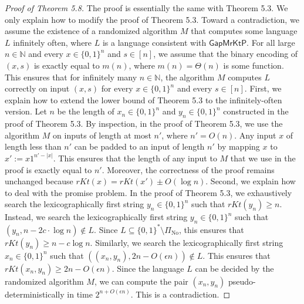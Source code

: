 \begin{proof}[Proof of Theorem 5.8]
The proof is essentially the same with Theorem 5.3. We only explain how to modify the proof of Theorem 5.3.
Toward a contradiction, we assume the existence of a randomized algorithm $M$ that computes some language $L$ infinitely often, where $L$ is a language consistent with $\mathsf{GapMrKtP}$. For all large $n\in\mathbb N$ and every $x\in\{0,1\}^n$ and $s\in[n]$, we assume that the binary encoding of $(x,s)$ is exactly equal to $m(n)$, where $m(n)=\Theta(n)$ is some function. This ensures that for infinitely many $n\in\mathbb N$, the algorithm $M$ computes $L$ correctly on input $(x,s)$ for every $x\in\{0,1\}^n$ and every $s\in[n]$.
First, we explain how to extend the lower bound of Theorem 5.3 to the infinitely-often version. Let $n$ be the length of $x_n\in\{0,1\}^n$ and $y_n\in\{0,1\}^n$ constructed in the proof of Theorem 5.3. By inspection, in the proof of Theorem 5.3, we use the algorithm $M$ on inputs of length at most $n'$, where $n'=O(n)$. Any input $x$ of length less than $n'$ can be padded to an input of length $n'$ by mapping $x$ to $x':=x1^{n'-|x|}$. This ensures that the length of any input to $M$ that we use in the proof is exactly equal to $n'$. Moreover, the correctness of the proof remains unchanged because $rKt(x)=rKt(x')\pm O(\log n)$.
Second, we explain how to deal with the promise problem. In the proof of Theorem 5.3, we exhaustively search the lexicographically first string $y_n\in\{0,1\}^n$ such that $rKt(y_n)\geq n$. Instead, we search the lexicographically first string $y_n\in\{0,1\}^n$ such that $(y_n,n-2c\cdot\log n)\notin L$. Since $L\subseteq\{0,1\}^*\setminus\Pi_{\mathrm{No}}$, this ensures that $rKt(y_n)\geq n-c\log n$. Similarly, we search the lexicographically first string $x_n\in\{0,1\}^n$ such that $((x_n,y_n),2n-O(\epsilon n))\notin L$. This ensures that $rKt(x_n,y_n)\geq2n-O(\epsilon n)$. Since the language $L$ can be decided by the randomized algorithm $M$, we can compute the pair $(x_n,y_n)$ pseudo-deterministically in time $2^{n+O(\epsilon n)}$. This is a contradiction.
\end{proof}
